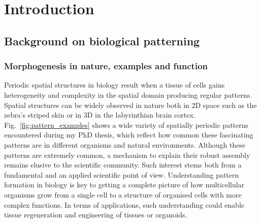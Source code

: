 \chapter{Introduction}\label{introduction}
\section{Background on biological patterning}
\subsection{Morphogenesis in nature, examples and function}

Periodic spatial structures in biology result when a tissue of cells gains heterogeneity and complexity in the spatial domain producing regular patterns.
Spatial structures can be widely observed in nature both in \acrfull{2D} space such as the zebra's striped skin or in \acrfull{3D} in the labyrinthian brain cortex.
Fig.~\ref{fig:pattern_examples} shows a wide variety of spatially periodic patterns encountered during my PhD thesis, which reflect how common these fascinating patterns are in different organisms and natural environments.
Although these patterns are extremely common, a mechanism to explain their robust assembly remains elusive to the scientific community.
Such interest stems both from a fundamental and an applied scientific point of view.
Understanding pattern formation in biology is key to getting a complete picture of how multicellular organisms grow from a single cell to a structure of organised cells with more complex functions.
In terms of applications, such understanding could enable tissue regeneration and engineering of tissues or organoids.

